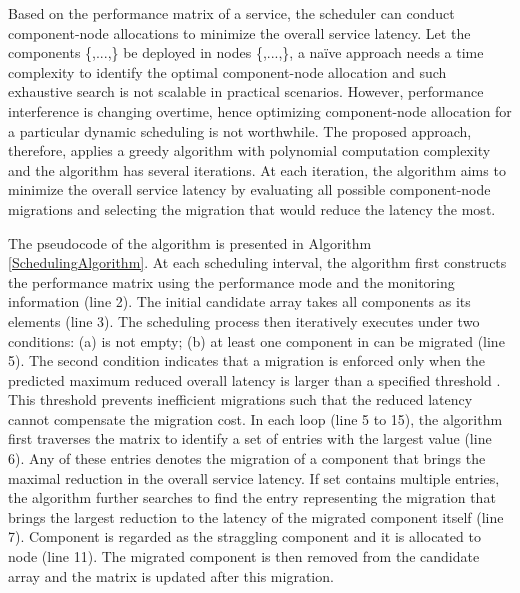 \documentclass[10pt, conference, compsocconf]{IEEEtran}
\begin{document}
Based on the performance matrix of a service, the scheduler can conduct component-node allocations to minimize the overall service latency. Let the  components \{,...,\} be deployed in  nodes \{,...,\}, a na\"{i}ve approach needs a time complexity  to identify the optimal component-node allocation and such exhaustive search is not scalable in practical scenarios. However, performance interference is changing overtime, hence optimizing component-node allocation for a particular dynamic scheduling is not worthwhile.
The proposed approach, therefore, applies a greedy algorithm with polynomial computation complexity and the algorithm has several iterations. At each iteration, the algorithm aims to minimize the overall service latency by evaluating all possible component-node migrations and selecting the migration that would reduce the latency the most.

The pseudocode of the algorithm is presented in Algorithm \ref{SchedulingAlgorithm}. At each scheduling interval, the algorithm first constructs the performance matrix  using the performance mode and the monitoring information (line 2). The initial candidate array  takes all  components as its elements (line 3). The scheduling process then iteratively executes under two conditions: (a)  is not empty; (b) at least one component in  can be migrated (line 5). The second condition indicates that a migration is enforced only when the predicted maximum reduced overall latency  is larger than a specified threshold . This threshold prevents inefficient migrations such that the reduced latency cannot compensate the migration cost. In each loop (line 5 to 15), the algorithm first traverses the matrix  to identify a set  of entries with the largest value (line 6). Any of these entries denotes the migration of a component that brings the maximal reduction in the overall service latency. If set  contains multiple entries,
the algorithm further searches  to find the entry  representing the migration that brings the largest reduction to the latency of the migrated component itself (line 7). Component  is regarded as the straggling component and it is allocated to node  (line 11). The migrated component  is then removed from the candidate array  and the matrix  is updated after this migration.
\end{document}
